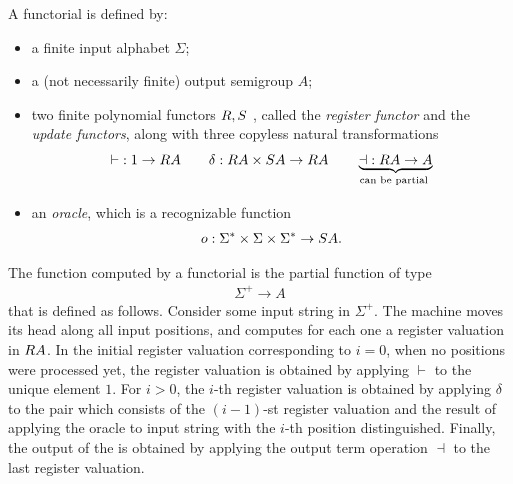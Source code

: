 \begin{definition}\label{def:functorial-sst}
    A functorial \sst is defined by:
    \begin{itemize}
    \item a finite  input alphabet $\Sigma$;
    \item a (not necessarily finite) output semigroup $A$;
    \item two finite polynomial functors $\functorr, \functors$ , called the \emph{register functor} and the \emph{update functors}, along with  three copyless natural transformations \begin{align*}
    \vdash\;: 1 \to \functorr A \qquad \delta : \functorr A \times \functors A \to \functorr A \qquad \myunderbrace{\dashv\;: \functorr A \to A}{can be partial}
    \end{align*}
    \item an \emph{oracle}, which is a recognizable function 
    \begin{align*}
    o : \Sigma^* \times \Sigma \times \Sigma^* \to \functors A.
    \end{align*}
    
    \end{itemize}
\end{definition}

The function computed by a functorial \sst is the partial function of type 
\begin{align*}
\Sigma^+ \to A
\end{align*}
that is defined as follows. Consider some input string in $\Sigma^+$. The machine moves its head along all input positions, and computes for each one a register valuation in $\functorr A$. In the initial register valuation corresponding to $i=0$, when no positions were processed yet, the register valuation  is obtained by applying $\vdash$ to the unique element $1$. For $i > 0$, the $i$-th register valuation is obtained by applying $\delta$ to the pair which consists of the $(i-1)$-st register valuation and the result of applying the oracle to input string with the $i$-th position distinguished. Finally, the output of the \sst is obtained by applying the output term operation $\dashv$ to the last  register valuation.

